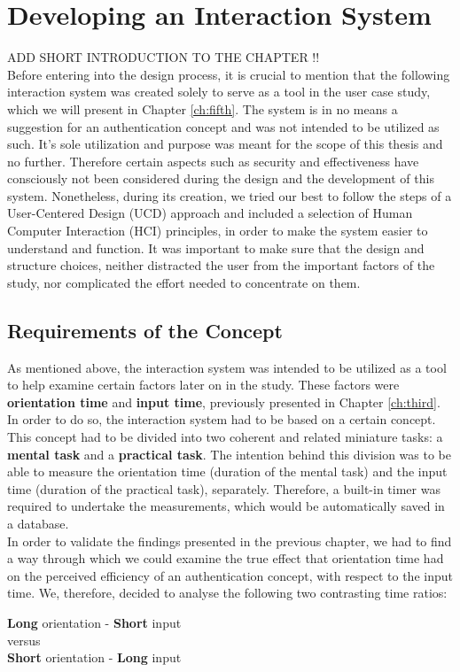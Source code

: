 
\chapter{Developing an Interaction System}\label{ch:forth}
ADD SHORT INTRODUCTION TO THE CHAPTER !!\\

Before entering into the design process, it is crucial to mention that the following interaction system was created solely to serve as a tool in the user case study, which we will present in Chapter \ref{ch:fifth}. The system is in no means a suggestion for an authentication concept and was not intended to be utilized as such. It's sole utilization and purpose was meant for the scope of this thesis and no further. Therefore certain aspects such as security and effectiveness have consciously not been considered during the design and the development of this system. Nonetheless, during its creation, we tried our best to follow the steps of a User-Centered Design (UCD) approach and included a selection of Human Computer Interaction (HCI) principles, in order to make the system easier to understand and function. It was important to make sure that the design and structure choices, neither distracted the user from the important factors of the study, nor complicated the effort needed to concentrate on them.  


\section{Requirements of the Concept} \label{4.1}
As mentioned above, the interaction system was intended to be utilized as a tool to help examine certain factors later on in the study. These factors were \textbf{orientation time} and \textbf{input time}, previously presented in Chapter \ref{ch:third}. In order to do so, the interaction system had to be based on a certain concept. This concept had to be divided into two coherent and related miniature tasks: a \textbf{mental task} and a \textbf{practical task}. The intention behind this division was to be able to measure the orientation time (duration of the mental task) and the input time (duration of the practical task), separately. Therefore, a built-in timer was required to undertake the measurements, which would be automatically saved in a database. \\

In order to validate the findings presented in the previous chapter, we had to find a way through which we could examine the true effect that orientation time had on the perceived efficiency of an authentication concept, with respect to the input time. We, therefore, decided to analyse the following two contrasting time ratios: 
\begin{center}
    \textbf{Long} orientation - \textbf{Short} input \\
    versus \\
    \textbf{Short} orientation - \textbf{Long} input
\end{center} 

